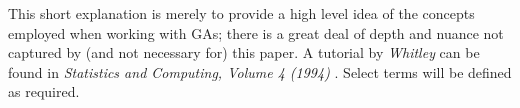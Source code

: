 \documentclass[a4paper,11pt,twoside,openright]{article}
\begin{document}
This short explanation is merely to provide a high level idea of the concepts
employed when working with GAs; there is a great deal of depth and nuance
not captured by (and not necessary for) this paper. A tutorial by
\textit{Whitley} can be found in \textit{Statistics and Computing, Volume 4
  (1994)} \cite{Whitley1994}. Select terms will be defined as required.
\end{document}
